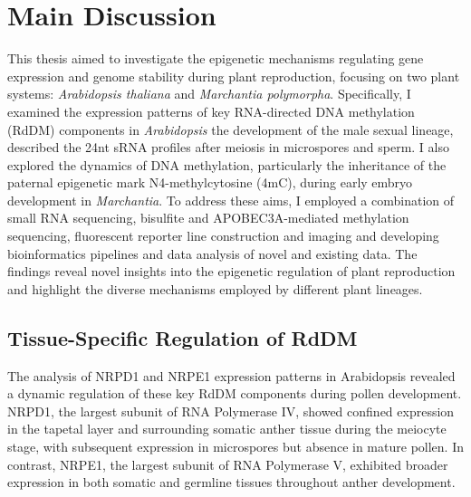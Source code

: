 \chapter{Main Discussion}

\ifpdf
    \graphicspath{{Chapter4/Figs/}}
\else
    \graphicspath{{Chapter3/Figs/}}
\fi


This thesis aimed to investigate the epigenetic mechanisms regulating gene expression and genome stability during plant reproduction, focusing on two plant systems: \textit{Arabidopsis thaliana} and \textit{Marchantia polymorpha}. Specifically, I examined the expression patterns of key RNA-directed DNA methylation (RdDM) components in \textit{Arabidopsis} the development of the male sexual lineage, described the 24nt sRNA profiles after meiosis in microspores and sperm. I also explored the dynamics of DNA methylation, particularly the inheritance of the paternal epigenetic mark N4-methylcytosine (4mC), during early embryo development in \textit{Marchantia}. To address these aims, I employed a combination of small RNA sequencing, bisulfite and APOBEC3A-mediated methylation sequencing,  fluorescent reporter line construction and imaging and developing bioinformatics pipelines and data analysis of novel and existing data. The findings reveal novel insights into the epigenetic regulation of plant reproduction and highlight the diverse mechanisms employed by different plant lineages.

\section{Tissue-Specific Regulation of RdDM}

The analysis of NRPD1 and NRPE1 expression patterns in Arabidopsis revealed a dynamic regulation of these key RdDM components during pollen development. NRPD1, the largest subunit of RNA Polymerase IV, showed confined expression in the tapetal layer and surrounding somatic anther tissue during the meiocyte stage, with subsequent expression in microspores but absence in mature pollen. In contrast, NRPE1, the largest subunit of RNA Polymerase V, exhibited broader expression in both somatic and germline tissues throughout anther development. 

